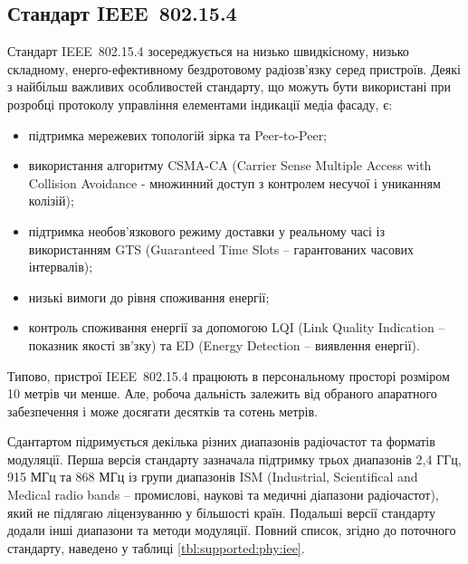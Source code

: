 \documentclass[a4paper,ukrainian,utf8,nocolumnsxix,floatsection,equationsection]{eskdtext}
\newcommand{\iee}[0]{IEEE~802.15.4\xspace}
\newcommand{\engtxt}[1]{\foreignlanguage{english}{#1}}
\begin{document}
\subsection{Стандарт \iee}
\label{sub:ieee:standard}


Стандарт \iee зосереджується на низько швидкісному, низько складному, енерго-ефективному бездротовому радіозв’язку серед пристроїв. Деякі з найбільш важливих особливостей стандарту, що можуть бути використані при розробці протоколу управління елементами індикації медіа фасаду, є:
\begin{itemize}
	\item підтримка мережевих топологій зірка та Peer-to-Peer;
	\item використання алгоритму CSMA-CA (\engtxt{Carrier Sense Multiple Access with Collision Avoidance} - множинний доступ з контролем несучої і униканням колізій);
	\item підтримка необов’язкового режиму доставки у реальному часі із використанням GTS (Guaranteed Time Slots – гарантованих  часових інтервалів);
	\item низькі вимоги до рівня споживання енергії;
	\item контроль споживання енергії за допомогою LQI (Link Quality Indication – показник якості зв’зку) та ED (Energy Detection – виявлення енергії).
\end{itemize}

Типово, пристрої \iee працюють в персональному просторі розміром 10 метрів чи менше. Але, робоча дальність залежить від обраного апаратного забезпечення і може досягати десятків та сотень метрів.

Сдантартом підримується декілька різних диапазонів радіочастот та форматів модуляції. Перша версія стандарту зазначала підтримку трьох диапазонів 2,4 ГГц, 915 МГц та 868 МГц із групи диапазонів ISM (Industrial, Scientifical and Medical radio bands – промислові, наукові та медичні діапазони радіочастот), який не підлягаю ліцензуванню у більшості країн. Подальші версії стандарту додали інші диапазони та методи модуляції. Повний список, згідно до поточного стандарту, наведено у таблиці \ref{tbl:supported:phy:iee}.
\end{document}
